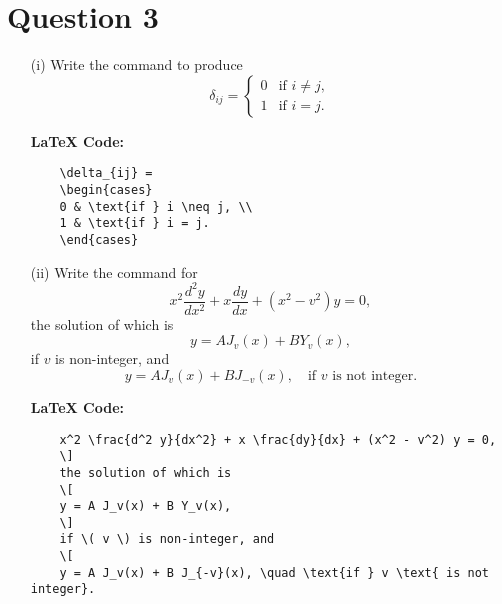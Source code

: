 \section*{Question 3}
\begin{enumerate}
    \item[(i)] Write the command to produce
    \[
    \delta_{ij} = 
    \begin{cases} 
    0 & \text{if } i \neq j, \\
    1 & \text{if } i = j.
    \end{cases}
    \]
    
    \textbf{LaTeX Code:}
    \begin{verbatim}
    \delta_{ij} = 
    \begin{cases} 
    0 & \text{if } i \neq j, \\
    1 & \text{if } i = j.
    \end{cases}
    \end{verbatim}
    
    \item[(ii)] Write the command for
    \[
    x^2 \frac{d^2 y}{dx^2} + x \frac{dy}{dx} + (x^2 - v^2) y = 0,
    \]
    the solution of which is
    \[
    y = A J_v(x) + B Y_v(x),
    \]
    if \( v \) is non-integer, and
    \[
    y = A J_v(x) + B J_{-v}(x), \quad \text{if } v \text{ is not integer}.
    \]
    
    \textbf{LaTeX Code:}
    \begin{verbatim}
    x^2 \frac{d^2 y}{dx^2} + x \frac{dy}{dx} + (x^2 - v^2) y = 0,
    \]
    the solution of which is
    \[
    y = A J_v(x) + B Y_v(x),
    \]
    if \( v \) is non-integer, and
    \[
    y = A J_v(x) + B J_{-v}(x), \quad \text{if } v \text{ is not integer}.
    \end{verbatim}
\end{enumerate}
